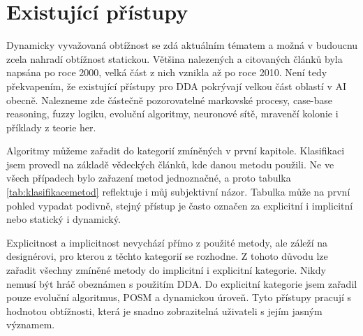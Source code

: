 \chapter{Existující přístupy}

Dynamicky vyvažovaná obtížnost se zdá aktuálním tématem a možná v budoucnu zcela nahradí obtížnost statickou. Většina nalezených a citovaných článků byla napsána po roce 2000, velká část z nich vznikla až po roce 2010. Není tedy překvapením, že existující přístupy pro DDA pokrývají velkou část oblastí v AI obecně. Nalezneme zde částečně pozorovatelné markovské procesy, case-base reasoning, fuzzy logiku, evoluční algoritmy, neuronové sítě, mravenčí kolonie i příklady z teorie her.

Algoritmy můžeme zařadit do kategorií zmíněných v první kapitole. Klasifikaci jsem provedl na základě vědeckých článků, kde danou metodu použili. Ne ve všech případech bylo zařazení metod jednoznačné, a proto tabulka \ref{tab:klasifikacemetod} reflektuje i můj subjektivní názor. Tabulka může na první pohled vypadat podivně, stejný přístup je často označen za explicitní i implicitní nebo statický i dynamický. 

Explicitnost a implicitnost nevychází přímo z použité metody, ale záleží na designérovi, pro kterou z těchto kategorií se rozhodne. Z tohoto důvodu lze zařadit všechny zmíněné metody do implicitní i explicitní kategorie. Nikdy nemusí být hráč obeznámen s použitím DDA. Do explicitní kategorie jsem zařadil pouze evoluční algoritmus, POSM a dynamickou úroveň. Tyto přístupy pracují s hodnotou obtížnosti, která je snadno zobrazitelná uživateli s jejím jasným významem.

